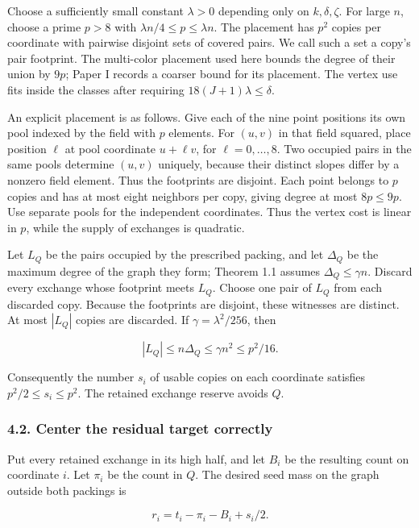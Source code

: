\documentclass[english,11pt,a4paper]{article}
\begin{document}
Choose a sufficiently small constant \(\lambda>0\) depending only on \(k,\delta,\zeta\). For large \(n\), choose a prime \(p>8\) with \(\lambda n/4\le p\le\lambda n\). The placement has \(p^2\) copies per coordinate with pairwise disjoint sets of covered pairs. We call such a set a copy's pair footprint. The multi-color placement used here bounds the degree of their union by \(9p\); Paper I records a coarser bound for its placement. The vertex use fits inside the classes after requiring \(18(J+1)\lambda\le\delta\).

An explicit placement is as follows. Give each of the nine point positions its own pool indexed by the field with \(p\) elements. For \((u,v)\) in that field squared, place position \(\ell\) at pool coordinate \(u+\ell v\), for \(\ell=0,\ldots,8\). Two occupied pairs in the same pools determine \((u,v)\) uniquely, because their distinct slopes differ by a nonzero field element. Thus the footprints are disjoint. Each point belongs to \(p\) copies and has at most eight neighbors per copy, giving degree at most \(8p\le9p\). Use separate pools for the independent coordinates. Thus the vertex cost is linear in \(p\), while the supply of exchanges is quadratic.

Let \(L_Q\) be the pairs occupied by the prescribed packing, and let \(\Delta_Q\) be the maximum degree of the graph they form; Theorem 1.1 assumes \(\Delta_Q\le\gamma n\). Discard every exchange whose footprint meets \(L_Q\). Choose one pair of \(L_Q\) from each discarded copy. Because the footprints are disjoint, these witnesses are distinct. At most \(|L_Q|\) copies are discarded. If \(\gamma=\lambda^2/256\), then

\[|L_Q|\le n\Delta_Q\le\gamma n^2\le p^2/16.\]

Consequently the number \(s_i\) of usable copies on each coordinate satisfies \(p^2/2\le s_i\le p^2\). The retained exchange reserve avoids \(Q\).

\subsubsection{4.2. Center the residual target correctly}\label{center-the-residual-target-correctly}

Put every retained exchange in its high half, and let \(B_i\) be the resulting count on coordinate \(i\). Let \(\pi_i\) be the count in \(Q\). The desired seed mass on the graph outside both packings is

\[r_i=t_i-\pi_i-B_i+s_i/2.\tag{4.1}\]
\end{document}
